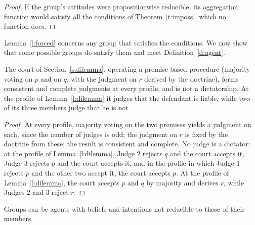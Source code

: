 \documentclass{situationist-preprint}
\begin{document}
\begin{proof}
If the group's attitudes were propositionwise reducible, its aggregation function would satisfy all the conditions of Theorem~\ref{t:imposs}, which no function does.
\end{proof}

Lemma~\ref{l:forced} concerns any group that satisfies the conditions. We now show that some possible groups do satisfy them and meet Definition~\ref{d:agent}.

\begin{lemma}\label{l:premise}
The court of Section~\ref{s:dilemma}, operating a premise-based procedure (majority voting on $p$ and on $q$, with the judgment on $r$ derived by the doctrine), forms consistent and complete judgments at every profile, and is not a dictatorship. At the profile of Lemma~\ref{l:dilemma} it judges that the defendant is liable, while two of its three members judge that he is not.
\end{lemma}

\begin{proof}
At every profile, majority voting on the two premises yields a judgment on each, since the number of judges is odd; the judgment on $r$ is fixed by the doctrine from these; the result is consistent and complete. No judge is a dictator: at the profile of Lemma~\ref{l:dilemma}, Judge 2 rejects $q$ and the court accepts it, Judge 3 rejects $p$ and the court accepts it, and in the profile in which Judge 1 rejects $p$ and the other two accept it, the court accepts $p$. At the profile of Lemma~\ref{l:dilemma}, the court accepts $p$ and $q$ by majority and derives $r$, while Judges 2 and 3 reject $r$.
\end{proof}

\begin{theorem}\label{t:main}
Groups can be agents with beliefs and intentions not reducible to those of their members.
\end{theorem}
\end{document}
